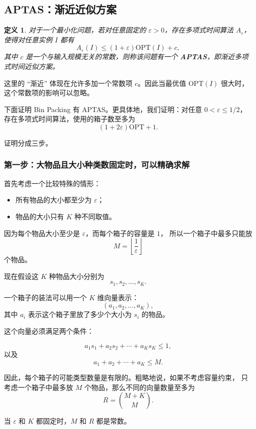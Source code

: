 \documentclass[UTF8,openany,12pt]{ctexbook}
\newtheorem{definition}{定义}[chapter]
\theoremstyle{remark}
\newcommand{\OPT}{\mathrm{OPT}}
\begin{document}
\subsection{APTAS：渐近近似方案}

\begin{definition}
对于一个最小化问题，若对任意固定的 $\varepsilon>0$，存在多项式时间算法
$A_\varepsilon$，使得对任意实例 $I$ 都有
\[
  A_\varepsilon(I)\le (1+\varepsilon)\OPT(I)+c,
\]
其中 $c$ 是一个与输入规模无关的常数，则称该问题有一个
\textbf{APTAS}，即渐近多项式时间近似方案。
\end{definition}

这里的 ``渐近'' 体现在允许多加一个常数项 $c$。因此当最优值
$\OPT(I)$ 很大时，这个常数项的影响可以忽略。

下面证明 Bin Packing 有 APTAS。更具体地，我们证明：对任意
$0<\varepsilon\le 1/2$，存在多项式时间算法，使用的箱子数至多为
\[
  (1+2\varepsilon)\OPT+1.
\]

证明分成三步。

\subsubsection*{第一步：大物品且大小种类数固定时，可以精确求解}

首先考虑一个比较特殊的情形：

\begin{itemize}
  \item 所有物品的大小都至少为 $\varepsilon$；
  \item 物品的大小只有 $K$ 种不同取值。
\end{itemize}

因为每个物品大小至少是 $\varepsilon$，而每个箱子的容量是 $1$，
所以一个箱子中最多只能放
\[
  M=\left\lfloor \frac{1}{\varepsilon}\right\rfloor
\]
个物品。

现在假设这 $K$ 种物品大小分别为
\[
  s_1,s_2,\dots,s_K.
\]

一个箱子的装法可以用一个 $K$ 维向量表示：
\[
  (a_1,a_2,\dots,a_K),
\]
其中 $a_i$ 表示这个箱子里放了多少个大小为 $s_i$ 的物品。

这个向量必须满足两个条件：

\[
  a_1s_1+a_2s_2+\cdots+a_Ks_K\le 1,
\]
以及
\[
  a_1+a_2+\cdots+a_K\le M.
\]

因此，每个箱子的可能类型数量是有限的。粗略地说，如果不考虑容量约束，
只考虑一个箱子中最多放 $M$ 个物品，那么不同的向量数量至多为
\[
  R=\binom{M+K}{M}.
\]

当 $\varepsilon$ 和 $K$ 都固定时，$M$ 和 $R$ 都是常数。
\end{document}
